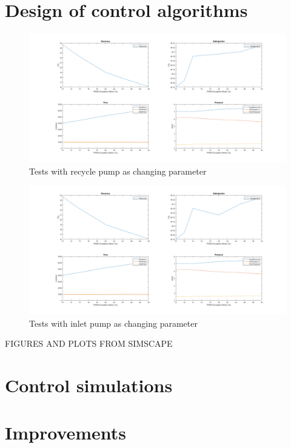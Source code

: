 \section{Design of control algorithms}

\begin{figure}[h]
    \centering
    \includegraphics[width=1.65\textwidth, angle = 270]{PreTestReg1.png}
    \caption{Tests with recycle pump as changing parameter}
    \label{fig:PreTestReg1}
\end{figure}

\begin{figure}[h]
    \centering 
    \includegraphics[width=1.65\textwidth, angle=270]{PreTestReg3.png}
    \caption{Tests with inlet pump as changing parameter}
    \label{fig:PreTestReg3}
\end{figure}





FIGURES AND PLOTS FROM SIMSCAPE


\section{Control simulations}




\section{Improvements}

